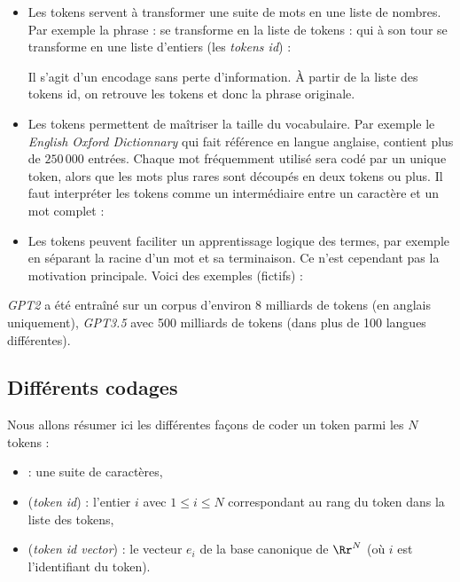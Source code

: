 \documentclass[11pt,class=report,crop=false]{standalone}
\begin{document}
\begin{itemize}
	\item Les tokens servent à transformer une suite de mots en une liste de nombres.
	Par exemple la phrase :
	se transforme en la liste de tokens :
	qui à son tour se transforme en une liste d'entiers (les \emph{tokens id}) :
	\mycenterline{[6759, 10024, 873, 318, 262, 16599, 286, 262, 19838]}
	
	Il s'agit d'un encodage sans perte d'information. À partir de la liste des tokens id, on retrouve les tokens et donc la phrase originale.
	
	\item Les tokens permettent de maîtriser la taille du vocabulaire.
	Par exemple le \emph{English Oxford Dictionnary} qui fait référence en langue anglaise, contient plus de $250\,000$ entrées. 
	Chaque mot fréquemment utilisé sera codé par un unique token, alors que les mots plus rares sont découpés en deux tokens ou plus. Il faut interpréter les tokens comme un intermédiaire entre un caractère et un mot complet :
	
	\item Les tokens peuvent faciliter un apprentissage logique des termes, par exemple en séparant la racine d'un mot et sa terminaison. Ce n'est cependant pas la motivation principale. Voici des exemples (fictifs) :

	
\end{itemize}	
	
	
\emph{GPT2} a été entraîné sur un corpus d'environ 8 milliards de tokens (en anglais uniquement), \emph{GPT3.5} avec 500  milliards de tokens (dans plus de 100 langues différentes).


\subsection{Différents codages}

Nous allons résumer ici les différentes façons de coder un token parmi les $N$ tokens :
\begin{itemize}
	\item {} : une suite de caractères,
	\item {} (\emph{token id}) : l'entier $i$ avec $1 \le i \le N$ correspondant au rang du token dans la liste des tokens,
	\item {} (\emph{token id vector}) : le vecteur $e_i$ de la base canonique de $\Rr^N$ (où $i$ est l'identifiant du token).
\end{itemize}
\end{document}
